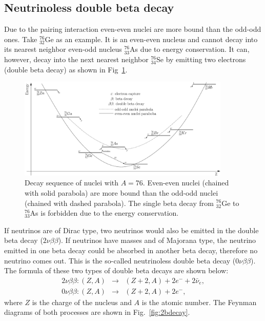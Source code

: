 \subsection{Neutrinoless double beta decay}
\label{sec:nonubb}
Due to the pairing interaction even-even nuclei are more bound than the odd-odd ones. Take $^{76}_{32}$Ge as an example. It is an even-even nucleus and cannot decay into its nearest neighbor even-odd nucleus $^{76}_{33}$As due to energy conservation. It can, however, decay into the next nearest neighbor $^{76}_{34}$Se by emitting two electrons (double beta decay) as shown in Fig~\ref{fig:ee2oo}. 
\begin{figure}[tbhp]
  \centering
  \includegraphics[width=0.9\textwidth]{Espec0nu2b.eps}  
  \caption{Decay sequence of nuclei with $A=76$. Even-even nuclei     (chained with solid parabola) are more bound than the odd-odd     nuclei (chained with dashed parabola). The single beta decay from     $^{76}_{32}$Ge to $^{76}_{33}$As is forbidden due to the energy     conservation.}
  \label{fig:ee2oo}
\end{figure}
If neutrinos are of Dirac type, two neutrinos would also be emitted in the double beta decay ($2\nu\beta\beta$). If neutrinos have masses and of Majorana type, the neutrino emitted in one beta decay could be absorbed in another beta decay, therefore no neutrino comes out. This is the so-called neutrinoless double beta decay ($0\nu\beta\beta$). The formula of these two types of double beta decays are shown below:
\begin{eqnarray}
  2\nu\beta\beta: (Z,A) &\rightarrow& (Z+2,A) + 2e^{-} +
  2\bar{\nu}_{e}, \\\label{eq:2nu2b}
  0\nu\beta\beta: (Z,A) &\rightarrow& (Z+2,A) + 2e^{-},
\label{eq:0nu2b}
\end{eqnarray}
where $Z$ is the charge of the nucleus and $A$ is the atomic number.
The Feynman diagrams of both processes are shown in
Fig.~\ref{fig:2bdecay}.
